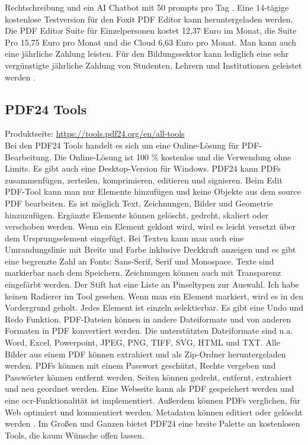 Rechtschreibung und ein AI Chatbot mit 50 prompts pro Tag \cite{foxit-um}. Eine 14-tägige kostenlose Testversion für den Foxit PDF Editor kann heruntergeladen werden. Die PDF Editor Suite für Einzelpersonen kostet 12,37 Euro im Monat, die Suite Pro 15,75 Euro pro Monat und die Cloud 6,63 Euro pro Monat. Man kann auch eine jährliche Zahlung leisten. Für den Bildungssektor kann lediglich eine sehr vergünstigte jährliche Zahlung von Studenten, Lehrern und Institutionen geleistet werden \cite{foxit-editor}. 

\subsection{PDF24 Tools}
Produktseite: \url{https://tools.pdf24.org/en/all-tools} \\
Bei den PDF24 Tools handelt es sich um eine Online-Lösung für PDF-Bearbeitung. Die Online-Lösung ist 100 \% kostenlos und die Verwendung ohne Limits. Es gibt auch eine Desktop-Version für Windows. PDF24 kann PDFs zusammenfügen, zerteilen, komprimieren, editieren und signieren. Beim Edit PDF-Tool kann man nur Elemente hinzufügen und keine Objekte aus dem source PDF bearbeiten. Es ist möglich Text, Zeichnungen, Bilder und Geometrie hinzuzufügen. Ergänzte Elemente können gelöscht, gedreht, skaliert oder verschoben werden. Wenn ein Element geklont wird, wird es leicht versetzt über dem Ursprungselement eingefügt. Bei Texten kann man auch eine Umrandungslinie mit Breite und Farbe inklusive Deckkraft anzeigen und es gibt eine begrenzte Zahl an Fonts: Sans-Serif, Serif und Monospace. Texte sind markierbar nach dem Speichern. Zeichnungen können auch mit Transparenz eingefärbt werden. Der Stift hat eine Liste an Pinseltypen zur Auswahl. Ich habe keinen Radierer im Tool gesehen. Wenn man ein Element markiert, wird es in den Vordergrund geholt. Jedes Element ist einzeln selektierbar. Es gibt eine Undo und Redo Funktion. PDF-Dateien können in andere Dateiformate und von anderen Formaten in PDF konvertiert werden. Die unterstützten Dateiformate sind u.a. Word, Excel, Powerpoint, JPEG, PNG, TIFF, SVG, HTML und TXT. Alle Bilder aus einem PDF können extrahiert und als Zip-Ordner heruntergeladen werden. PDFs können mit einem Passwort geschützt, Rechte vergeben und Passwörter können entfernt werden. Seiten können gedreht, entfernt, extrahiert und neu geordnet werden. Eine Webseite kann als PDF gespeichert werden und eine \gls{ocr}-Funktionalität ist implementiert. Außerdem können PDFs verglichen, für Web optimiert und kommentiert werden. Metadaten können editiert oder gelöscht werden \cite{pdf24}. Im Großen und Ganzen bietet PDF24 eine breite Palette an kostenlosen Tools, die kaum Wünsche offen lassen.

